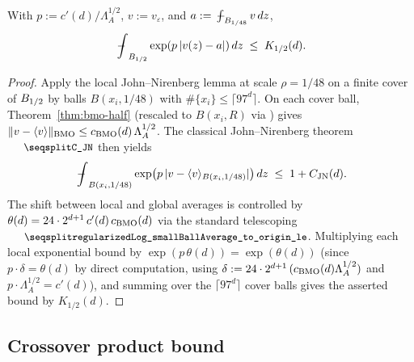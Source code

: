 \begin{theorem}
\label{thm:exp-half}
\leanok
{}
With $p := c'(d)/\Lambda_A^{1/2}$, $v := v_\varepsilon$, and
$a := \fint_{\Bz{1/48}} v\,dz$,
\begin{equation*}
  \fint_{\Bz{1/2}} \exp(p\,|v(z) - a|)\,dz \;\leq\; K_{1/2}(d).
\end{equation*}
\end{theorem}

\begin{proof}
\leanok
{}

Apply the local John--Nirenberg lemma at scale $\rho = 1/48$ on a finite cover
of $B_{1/2}$ by balls $B(x_i, 1/48)$ with $\#\{x_i\} \leq \lceil 97^d\rceil$.
On each cover ball, Theorem~\ref{thm:bmo-half} (rescaled to $B(x_i, R)$ via
) gives
$\|v - \langle v\rangle\|_{\mathrm{BMO}} \leq c_{\mathrm{BMO}}(d)\,\Lambda_A^{1/2}$. The
classical John--Nirenberg theorem $\leanname{C\_JN}$ then yields
\begin{equation*}
  \fint_{B(x_i,1/48)} \exp\bigl(p\,|v - \langle v\rangle_{B(x_i,1/48)}|\bigr)\,dz
    \;\leq\; 1 + \CJN(d).
\end{equation*}
The shift between local and global averages is controlled by $\theta(d) =
24 \cdot 2^{d+1}\,c'(d)\,c_{\mathrm{BMO}}(d)$ via the standard telescoping
$\leanname{regularizedLog\_smallBallAverage\_to\_origin\_le}$. Multiplying
each local exponential bound by $\exp(p\,\theta(d)) = \exp(\theta(d))$ (since
$p\cdot \delta = \theta(d)$ by direct computation, using
$\delta := 24\cdot 2^{d+1}\,(c_{\mathrm{BMO}}(d)\Lambda_A^{1/2})$ and
$p \cdot \Lambda_A^{1/2} = c'(d)$), and summing over the $\lceil 97^d\rceil$
cover balls gives the asserted bound by $K_{1/2}(d)$.
\end{proof}

\subsection{Crossover product bound}

